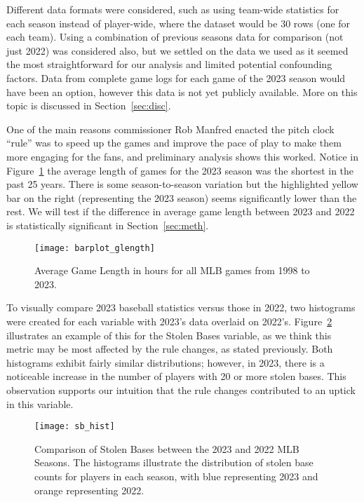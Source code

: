 \documentclass[12pt]{article}
\begin{document}
Different data formats were considered, such as using team-wide statistics
for each season instead of player-wide, where the dataset would be 30 rows (one
for each team). Using a combination of previous seasons data for comparison (not
just 2022) was considered also, but we settled on the data we used as it seemed
the most straightforward for our analysis and limited potential confounding
factors. Data from complete game logs for each game of the 2023 season would have
been an option, however this data is not yet publicly available. More on this topic
is discussed in Section~\ref{sec:disc}.

One of the main reasons commissioner Rob Manfred enacted the pitch clock ``rule''
was to speed up the games and improve the pace of play to make them more engaging
for the fans, and preliminary analysis shows this worked. Notice in Figure~\ref{fig:Fig1}
the average length of games for the 2023 season was the shortest in the past 25 years.
There is some season-to-season variation but the highlighted yellow bar on the right
(representing the 2023 season) seems significantly lower than the rest. We will
test if the difference in average game length between 2023 and 2022 is statistically
significant in Section~\ref{sec:meth}.

\begin{figure}[tbp]
  \centering
  \texttt{[image: barplot\_glength]}
  \caption{Average Game Length in hours for all MLB games from 1998 to 2023.}
  \label{fig:Fig1}
\end{figure}

To visually compare 2023 baseball statistics versus those in 2022, two histograms
were created for each variable with 2023's data overlaid on 2022's. Figure~\ref{fig:Fig2}
illustrates an example of this for the Stolen Bases variable, as we think this
metric may be most affected by the rule changes, as stated previously. Both
histograms exhibit fairly similar distributions; however, in 2023, there is a
noticeable increase in the number of players with 20 or more stolen bases. This
observation supports our intuition that the rule changes contributed to an uptick
in this variable.

\begin{figure}[tbp]
  \centering
  \texttt{[image: sb\_hist]}
  \caption{Comparison of Stolen Bases between the 2023 and 2022 MLB Seasons. The
  histograms illustrate the distribution of stolen base counts for players in each
  season, with blue representing 2023 and orange representing 2022.}
  \label{fig:Fig2}
\end{figure}
\end{document}
